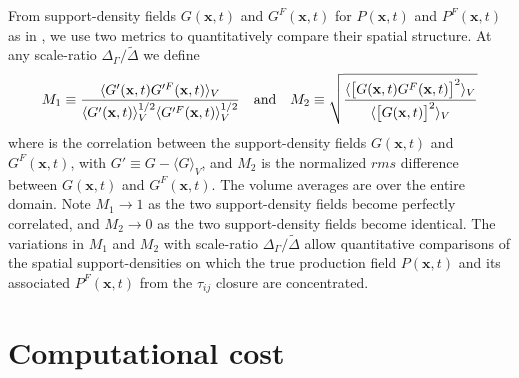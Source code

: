 From support-density fields   $G(\mathbf{x},t)$  and  $G^{F}(\mathbf{x},t)$   for   $P(\mathbf{x},t)$  and  $P^{F}(\mathbf{x},t)$    as in , we use two metrics to quantitatively compare their spatial structure. At any scale-ratio  $\Delta_{\Gamma}/\widetilde{\Delta}$ we define
%
\begin{equation}
	\label{E:11}
	M_1 \equiv \frac{\langle G'(\mathbf{x},t) G'^{F}(\mathbf{x},t)  \rangle_{V}}
	{\langle G'(\mathbf{x},t) \rangle_{V}^{1/2}  
	 \langle G'^{F}(\mathbf{x},t) \rangle_{V}^{1/2}} 
	\quad \textnormal{and} \quad
	 M_2 \equiv \sqrt{\frac{\langle \big[ G(\mathbf{x},t) G^{F}(\mathbf{x},t) \big]^{2} \rangle_{V}}
	{\langle \big[ G(\mathbf{x},t) \big]^2 \rangle_{V}}}
\end{equation}
%
%                
where   is the correlation between the support-density fields $G(\mathbf{x},t)$  and  $G^{F}(\mathbf{x},t)$, with $G' \equiv G - \langle G \rangle_V$, and $M_2$  is the normalized $rms$ difference between  $G(\mathbf{x},t)$  and  $G^{F}(\mathbf{x},t)$. The volume averages are over the entire domain. Note $M_1 \rightarrow 1$  as the two support-density fields become perfectly correlated, and  $M_2 \rightarrow 0$  as the two support-density fields become identical. The variations in  $M_1$ and $M_2$  with scale-ratio $\Delta_{\Gamma}/\widetilde{\Delta}$  allow quantitative comparisons of the spatial support-densities on which the true production field  $P(\mathbf{x},t)$  and its associated $P^{F}(\mathbf{x},t)$ from the $\tau_{ij}$  closure are concentrated. 

\section{Computational cost}
\label{sec:IIIF}

